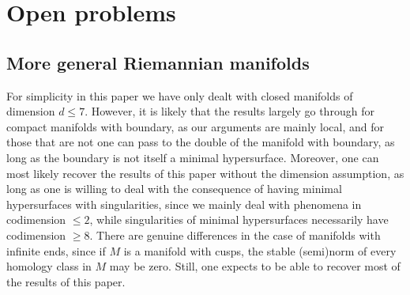 \documentclass[reqno,11pt]{amsart}
\newcommand*\dif{\mathop{}\!\mathrm{d}}
\theoremstyle{definition}
\numberwithin{equation}{section}
\newcommand\todo[1]{\textcolor{red}{TODO: #1}}
\begin{document}












\section{Open problems}\label{open problems}
\subsection{More general Riemannian manifolds}
For simplicity in this paper we have only dealt with closed manifolds of dimension $d \leq 7$.
However, it is likely that the results largely go through for compact manifolds with boundary, as our arguments are mainly local, and for those that are not one can pass to the double of the manifold with boundary, as long as the boundary is not itself a minimal hypersurface.
Moreover, one can most likely recover the results of this paper without the dimension assumption, as long as one is willing to deal with the consequence of having minimal hypersurfaces with singularities, since we mainly deal with phenomena in codimension $\leq 2$, while singularities of minimal hypersurfaces necessarily have codimension $\geq 8$. 
There are genuine differences in the case of manifolds with infinite ends, since if $M$ is a manifold with cusps, the stable (semi)norm of every homology class in $M$ may be zero.
Still, one expects to be able to recover most of the results of this paper.
\end{document}
